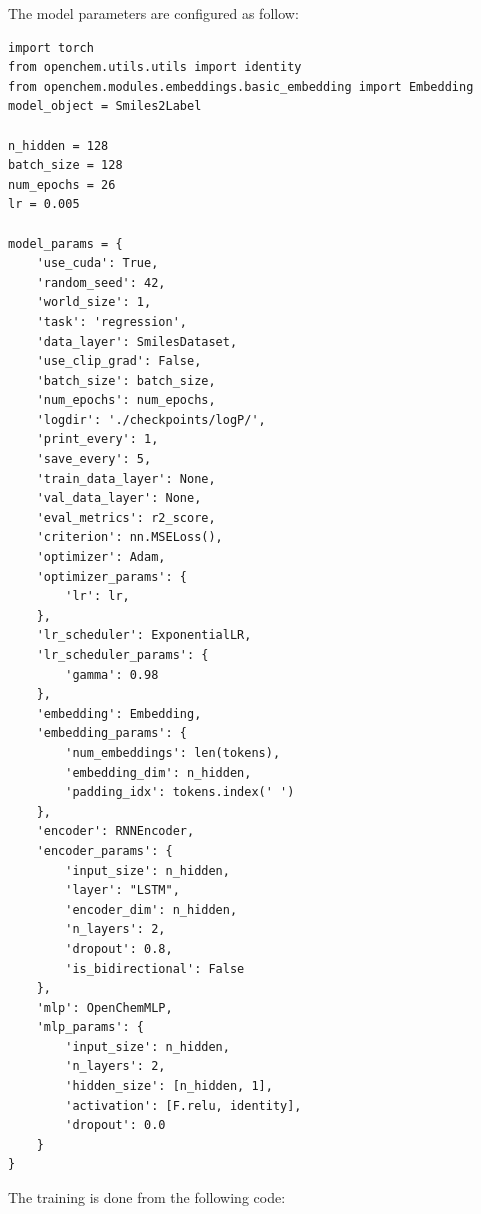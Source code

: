 \documentclass[a4paper]{article}
\begin{document}
The model parameters are configured as follow:

\begin{lstlisting}
import torch
from openchem.utils.utils import identity
from openchem.modules.embeddings.basic_embedding import Embedding
model_object = Smiles2Label

n_hidden = 128
batch_size = 128
num_epochs = 26
lr = 0.005

model_params = {
    'use_cuda': True,
    'random_seed': 42,
    'world_size': 1,
    'task': 'regression',
    'data_layer': SmilesDataset,
    'use_clip_grad': False,
    'batch_size': batch_size,
    'num_epochs': num_epochs,
    'logdir': './checkpoints/logP/',
    'print_every': 1,
    'save_every': 5,
    'train_data_layer': None,
    'val_data_layer': None,
    'eval_metrics': r2_score,
    'criterion': nn.MSELoss(),
    'optimizer': Adam,
    'optimizer_params': {
        'lr': lr,
    },
    'lr_scheduler': ExponentialLR,
    'lr_scheduler_params': {
        'gamma': 0.98
    },
    'embedding': Embedding,
    'embedding_params': {
        'num_embeddings': len(tokens),
        'embedding_dim': n_hidden,
        'padding_idx': tokens.index(' ')
    },
    'encoder': RNNEncoder,
    'encoder_params': {
        'input_size': n_hidden,
        'layer': "LSTM",
        'encoder_dim': n_hidden,
        'n_layers': 2,
        'dropout': 0.8,
        'is_bidirectional': False
    },
    'mlp': OpenChemMLP,
    'mlp_params': {
        'input_size': n_hidden,
        'n_layers': 2,
        'hidden_size': [n_hidden, 1],
        'activation': [F.relu, identity],
        'dropout': 0.0
    }
}
\end{lstlisting}

The training is done from the following code:
\end{document}
